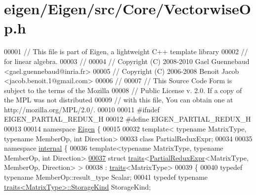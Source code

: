 \hypertarget{eigen_2_eigen_2src_2_core_2_vectorwise_op_8h_source}{}\section{eigen/\+Eigen/src/\+Core/\+Vectorwise\+Op.h}
\label{eigen_2_eigen_2src_2_core_2_vectorwise_op_8h_source}

\begin{DoxyCode}
00001 \textcolor{comment}{// This file is part of Eigen, a lightweight C++ template library}
00002 \textcolor{comment}{// for linear algebra.}
00003 \textcolor{comment}{//}
00004 \textcolor{comment}{// Copyright (C) 2008-2010 Gael Guennebaud <gael.guennebaud@inria.fr>}
00005 \textcolor{comment}{// Copyright (C) 2006-2008 Benoit Jacob <jacob.benoit.1@gmail.com>}
00006 \textcolor{comment}{//}
00007 \textcolor{comment}{// This Source Code Form is subject to the terms of the Mozilla}
00008 \textcolor{comment}{// Public License v. 2.0. If a copy of the MPL was not distributed}
00009 \textcolor{comment}{// with this file, You can obtain one at http://mozilla.org/MPL/2.0/.}
00010 
00011 \textcolor{preprocessor}{#ifndef EIGEN\_PARTIAL\_REDUX\_H}
00012 \textcolor{preprocessor}{#define EIGEN\_PARTIAL\_REDUX\_H}
00013 
00014 \textcolor{keyword}{namespace }\hyperlink{namespace_eigen}{Eigen} \{
00015 
00032 \textcolor{keyword}{template}< \textcolor{keyword}{typename} MatrixType, \textcolor{keyword}{typename} MemberOp, \textcolor{keywordtype}{int} Direction>
00033 \textcolor{keyword}{class }PartialReduxExpr;
00034 
00035 \textcolor{keyword}{namespace }\hyperlink{namespaceinternal}{internal} \{
00036 \textcolor{keyword}{template}<\textcolor{keyword}{typename} MatrixType, \textcolor{keyword}{typename} MemberOp, \textcolor{keywordtype}{int} Direction>
\hyperlink{struct_eigen_1_1internal_1_1traits_3_01_partial_redux_expr_3_01_matrix_type_00_01_member_op_00_01_direction_01_4_01_4}{00037} \textcolor{keyword}{struct }\hyperlink{struct_eigen_1_1internal_1_1traits}{traits}<\hyperlink{group___core___module_class_eigen_1_1_partial_redux_expr}{PartialReduxExpr}<MatrixType, MemberOp, Direction> >
00038  : \hyperlink{struct_eigen_1_1internal_1_1traits}{traits}<MatrixType>
00039 \{
00040   \textcolor{keyword}{typedef} \textcolor{keyword}{typename} MemberOp::result\_type Scalar;
00041   \textcolor{keyword}{typedef} \textcolor{keyword}{typename} \hyperlink{struct_eigen_1_1internal_1_1traits}{traits<MatrixType>::StorageKind} StorageKind;

\end{DoxyCode}
